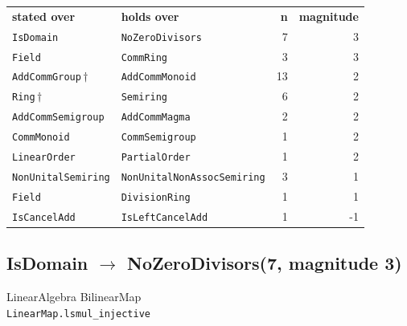 \documentclass[10pt,a4paper]{article}
\begin{document}
\begin{center}
\begin{tabular}{llrr}
\textbf{stated over} & \textbf{holds over} & \textbf{n} & \textbf{magnitude}\\[2pt]
\texttt{\small IsDomain} & \texttt{\small NoZeroDivisors} & 7 & 3\\
\texttt{\small Field} & \texttt{\small CommRing} & 3 & 3\\
\texttt{\small AddCommGroup}\,$\dagger$ & \texttt{\small AddCommMonoid} & 13 & 2\\
\texttt{\small Ring}\,$\dagger$ & \texttt{\small Semiring} & 6 & 2\\
\texttt{\small AddCommSemigroup} & \texttt{\small AddCommMagma} & 2 & 2\\
\texttt{\small CommMonoid} & \texttt{\small CommSemigroup} & 1 & 2\\
\texttt{\small LinearOrder} & \texttt{\small PartialOrder} & 1 & 2\\
\texttt{\small NonUnitalSemiring} & \texttt{\small NonUnitalNonAssocSemiring} & 3 & 1\\
\texttt{\small Field} & \texttt{\small DivisionRing} & 1 & 1\\
\texttt{\small IsCancelAdd} & \texttt{\small IsLeftCancelAdd} & 1 & -1\\
\end{tabular}
\end{center}

\subsection*{IsDomain $\to$ NoZeroDivisors\quad\textmd{\small (7, magnitude 3)}}
{\footnotesize\color{locator}LinearAlgebra\,\textperiodcentered\,BilinearMap}\\
\hspace*{1em}\texttt{\small LinearMap.\allowbreak{}lsmul\_injective}\\
\end{document}
